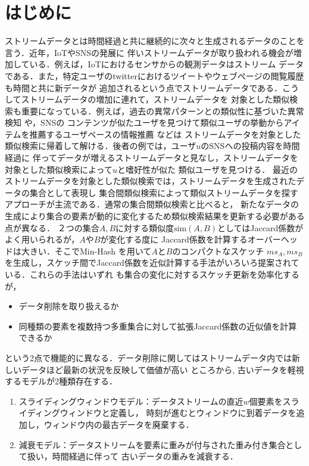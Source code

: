 \chapter{はじめに}
ストリームデータとは時間経過と共に継続的に次々と生成されるデータのことを言う．近年，IoTやSNSの発展に
伴いストリームデータが取り扱われる機会が増加している．例えば，IoTにおけるセンサからの観測データはストリーム
データである．また，特定ユーザのtwitterにおけるツイートやウェブぺージの閲覧履歴も時間と共に新データが
追加されるという点でストリームデータである．こうしてストリームデータの増加に連れて，ストリームデータを
対象とした類似検索も重要になっている．例えば，過去の異常パターンとの類似性に基づいた異常検知 \cite{microbiome} や，SNSの
コンテンツが似たユーザを見つけて類似ユーザの挙動からアイテムを推薦するユーザベースの情報推薦 \cite{POI} などは
ストリームデータを対象とした類似検索に帰着して解ける．後者の例では，ユーザ$u$のSNSへの投稿内容を時間経過に
伴ってデータが増えるストリームデータと見なし，ストリームデータを対象とした類似検索によって$u$と嗜好性が似た
類似ユーザを見つける．
最近のストリームデータを対象とした類似検索では，ストリームデータを生成されたデータの集合として表現し
集合間類似検索によって類似ストリームデータを探すアプローチが主流である．通常の集合間類似検索と比べると，
新たなデータの生成により集合の要素が動的に変化するため類似検索結果を更新する必要がある点が異なる．
２つの集合$A,B$に対する類似度$\mbox{sim}(A,B)$としてはJaccard係数がよく用いられるが，$A$や$B$が変化する度に
Jaccard係数を計算するオーバーヘッドは大きい．そこでMin-Hash \cite{Minhash}を用いて$A$と$B$のコンパクトなスケッチ
$ms_A,ms_B$を生成し，スケッチ間でJaccard係数を近似計算する手法がいろいろ提案されている．これらの手法はいずれ
も集合の変化に対するスケッチ更新を効率化するが，
\begin{itemize}
\item データ削除を取り扱えるか
\item 同種類の要素を複数持つ多重集合に対して拡張Jaccard係数の近似値を計算できるか
\end{itemize}
という2点で機能的に異なる．データ削除に関してはストリームデータ内では新しいデータほど最新の状況を反映して価値が高い
ところから, 古いデータを軽視するモデルが2種類存在する．
\begin{enumerate}
\item スライディングウィンドウモデル：データストリームの直近$w$個要素をスライディングウィンドウと定義し，
時刻が進むとウィンドウに到着データを追加し，ウィンドウ内の最古データを廃棄する．
\item 減衰モデル：データストリームを要素に重みが付与された重み付き集合として扱い，時間経過に伴って
古いデータの重みを減衰する．
\end{enumerate}
